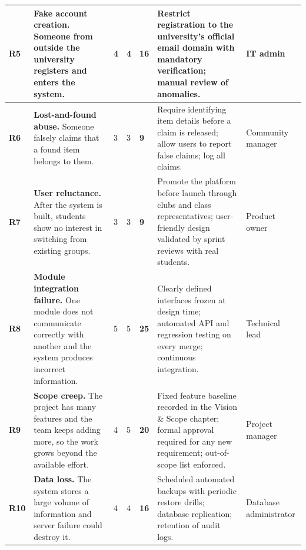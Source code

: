\documentclass[11pt,a4paper]{report}
\begin{document}
\begin{longtable}{|C{1.0cm}|L{3.55cm}|C{1.25cm}|C{1.25cm}|C{1.25cm}|L{3.4cm}|L{1.8cm}|}
\textbf{R5} &
\textbf{Fake account creation.} Someone from outside the university registers and
enters the system. &
4 & 4 & \textcolor{riskMed}{\textbf{16}} &
Restrict registration to the university's official email domain with mandatory
verification; manual review of anomalies. &
IT admin \\ \hline

\textbf{R6} &
\textbf{Lost-and-found abuse.} Someone falsely claims that a found item belongs
to them. &
3 & 3 & \textcolor{riskLow}{\textbf{9}} &
Require identifying item details before a claim is released; allow users to
report false claims; log all claims. &
Community manager \\ \hline

\textbf{R7} &
\textbf{User reluctance.} After the system is built, students show no interest in
switching from existing groups. &
3 & 3 & \textcolor{riskLow}{\textbf{9}} &
Promote the platform before launch through clubs and class representatives;
user-friendly design validated by sprint reviews with real students. &
Product owner \\ \hline

\textbf{R8} &
\textbf{Module integration failure.} One module does not communicate correctly
with another and the system produces incorrect information. &
5 & 5 & \textcolor{riskHigh}{\textbf{25}} &
Clearly defined interfaces frozen at design time; automated API and regression
testing on every merge; continuous integration. &
Technical lead \\ \hline

\textbf{R9} &
\textbf{Scope creep.} The project has many features and the team keeps adding
more, so the work grows beyond the available effort. &
4 & 5 & \textcolor{riskHigh}{\textbf{20}} &
Fixed feature baseline recorded in the Vision \& Scope chapter; formal approval
required for any new requirement; out-of-scope list enforced. &
Project manager \\ \hline

\textbf{R10} &
\textbf{Data loss.} The system stores a large volume of information and server
failure could destroy it. &
4 & 4 & \textcolor{riskMed}{\textbf{16}} &
Scheduled automated backups with periodic restore drills; database replication;
retention of audit logs. &
Database administrator \\ \hline

\end{longtable}
\endgroup
\end{document}
